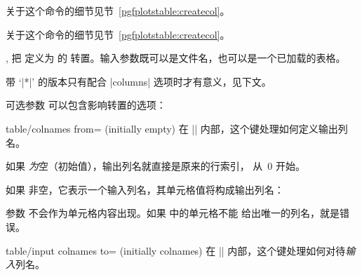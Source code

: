 \documentclass[a4paper,doc2]{ltxdoc}
\begin{document}
\begin{command}{\pgfplotstablenew{}}
    关于这个命令的细节见节~\ref{pgfplotstable:createcol}。
\end{command}
\begin{command}{\pgfplotstablecreatecol{}}
    关于这个命令的细节见节~\ref{pgfplotstable:createcol}。
\end{command}

\begin{commandlist}{%
    \pgfplotstabletranspose{},
    \pgfplotstabletranspose*{}%
}
    把  定义为  的
    转置。输入参数既可以是文件名，也可以是一个已加载的表格。

    带 `|*|' 的版本只有配合 |columns| 选项时才有意义，见下文。
\begin{codeexample}[]
\end{codeexample}

\begin{codeexample}[]
\pgfplotstabletranspose{}
\loadedtable
\end{codeexample}

    可选参数  可以包含影响转置的选项：
    \begin{pgfplotskey}{table/colnames from= (initially empty)}
        在 |\pgfplotstabletranspose| 内部，这个键处理如何定义输出列名。

        如果  \emph{为}空（初始值），输出列名就直接是原来的行索引，
        从~$0$ 开始。

        如果  非空，它表示一个输入列名，其单元格值将构成输出列名：
\begin{codeexample}[]
\pgfplotstabletranspose[colnames from=c]
\loadedtable
\end{codeexample}
        参数  不会作为单元格内容出现。如果  中的单元格不能
        给出唯一的列名，就是错误。
    \end{pgfplotskey}

    \begin{pgfplotskey}{table/input colnames to= (initially colnames)}
        在 |\pgfplotstabletranspose| 内部，这个键处理如何对待\emph{输入}列名。


\end{pgfplotskey}
\end{commandlist}
\end{document}
